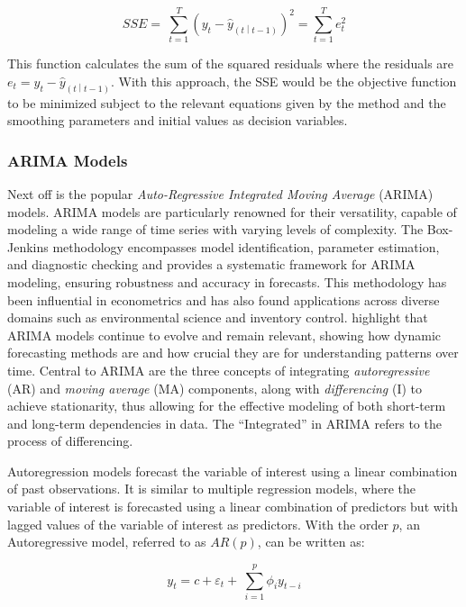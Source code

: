 \documentclass[12pt,a4paper]{article}
\begin{document}
\begin{equation}
  SSE=\ \sum_{t=1}^{T}\left(y_t-{\hat{y}}_{\left(t\middle| t-1\right)}\right)^2=\sum_{t=1}^{T}e_t^2
  \label{sse}
\end{equation}

This function calculates the sum of the squared residuals where the residuals are $e_t=y_t-{\hat{y}}_{\left(t\middle| t-1\right)}$. With this approach, the SSE would be the objective function to be minimized subject to the relevant equations given by the method and the smoothing parameters and initial values as decision variables. 

\subsubsection{ARIMA Models}
Next off is the popular \textit{Auto-Regressive Integrated Moving Average} (ARIMA) models. ARIMA models are particularly renowned for their versatility, capable of modeling a wide range of time series with varying levels of complexity. The Box-Jenkins methodology encompasses model identification, parameter estimation, and diagnostic checking and provides a systematic framework for ARIMA modeling, ensuring robustness and accuracy in forecasts. This methodology has been influential in econometrics and has also found applications across diverse domains such as environmental science and inventory control. \cite{DEGOOIJER2006443} highlight that ARIMA models continue to evolve and remain relevant, showing how dynamic forecasting methods are and how crucial they are for understanding patterns over time. Central to ARIMA are the three concepts of integrating \textit{autoregressive} (AR) and \textit{moving average} (MA) components, along with \textit{differencing} (I) to achieve stationarity, thus allowing for the effective modeling of both short-term and long-term dependencies in data. The “Integrated” in ARIMA refers to the process of differencing. 

Autoregression models forecast the variable of interest using a linear combination of past observations. It is similar to multiple regression models, where the variable of interest is forecasted using a linear combination of predictors but with lagged values of the variable of interest as predictors. With the order $p$, an Autoregressive model, referred to as $AR(p)$, can be written as: 

\begin{equation}
  y_t=c+\varepsilon_t+\ \sum_{i=1}^{p}{\phi_iy_{t-i}}
  \label{ar}
\end{equation}
\end{document}
